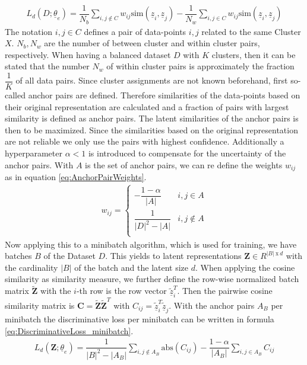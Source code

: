 \documentclass[12pt,DIV14,BCOR12mm,a4paper,footexclude,headinclude,halfparskip-,twoside,openright,cleardoubleempty,idxtotoc,bibtotoc,listtotoc]{scrreprt} %
\numberwithin{equation}{chapter}
\begin{document}
\begin{align}
	 L_d(D;\underline{\theta}_e) = \dfrac{1}{N_b}\sum_{i,j \not\in C}w_{ij}\textrm{sim}(\underline{z}_i,\underline{z}_j)-\dfrac{1}{N_w}\sum_{i,j \in C}w_{ij}\textrm{sim}(\underline{z}_i,\underline{z}_j)\label{eq:DiscriminativeLoss_ClusterAssignments}
\end{align}
The notation $i,j \in C$ defines a pair of data-points $i,j$ related to the same Cluster $X$. $N_b,N_w$ are the number of between cluster and within cluster pairs, respectively. When having a balanced dataset $D$ with $K$ clusters, then it can be stated that the number $N_w$ of within cluster pairs is approximately the fraction $\dfrac{1}{K}$ of all data pairs. Since cluster assignments are not known beforehand, first so-called anchor pairs are defined. Therefore similarities of the data-points based on their original representation are calculated and a fraction of pairs with largest similarity is defined as anchor pairs. The latent similarities of the anchor pairs is then to be maximized. Since the similarities based on the original representation are not reliable we only use the pairs with highest confidence. Additionally a hyperparameter $\alpha < 1$ is introduced to compensate for the uncertainty of the anchor pairs. With $A$ is the set of anchor pairs, we can re define the weights $w_{ij}$ as in equation \ref{eq:AnchorPairWeights}.
\begin{align}
	w_{ij} = \begin{cases} -\dfrac{1-\alpha}{|A|} & i,j \in A \\ \dfrac{1}{|D|^2-|A|} & i,j \not\in A\\ \end{cases} \label{eq:AnchorPairWeights}
\end{align}
Now applying this to a minibatch algorithm, which is used for training, we have batches $B$ of the Dataset $D$. This yields to latent representations $\mathbf{Z} \in R^{|B|\ \textrm{x}\ d}$ with the cardinality $|B|$ of the batch and the latent size $d$. When applying the cosine similarity as similarity measure, we further define the row-wise normalized batch matrix $\tilde{\mathbf{Z}}$ with the $i$-th row is the row vector $\tilde{\underline{z}}^{T}_i$. Then the pairwise cosine similarity matrix is $\mathbf{C} = \tilde{\mathbf{Z}}\tilde{\mathbf{Z}}^T$ with $C_{ij} = \tilde{\underline{z}}^{T}_i \tilde{\underline{z}}_j$. With the anchor pairs $A_B$ per minibatch the discriminative loss per minibatch can be written in formula \ref{eq:DiscriminativeLoss_minibatch}.
\begin{align}
	 L_d(\mathbf{Z};\underline{\theta}_e) = \dfrac{1}{|B|^2-|A_B|}\sum_{i,j \not\in A_B}\textrm{abs}(C_{ij})-\dfrac{1-\alpha}{|A_B|}\sum_{i,j \in A_B}C_{ij}\label{eq:DiscriminativeLoss_minibatch}
\end{align}
\end{document}
